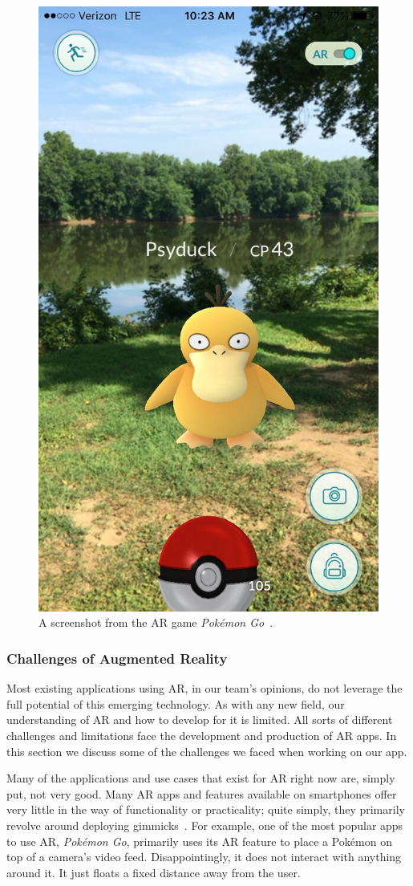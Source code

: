 \documentclass[a4paper, 10pt, american, titlepage]{article}
\begin{document}
\begin{figure}[h]
	\centering
	\includegraphics[width=.5\textwidth]{pokemon-go.jpg}
	\caption[A screenshot from the AR game \textit{Pokémon Go}]{A screenshot
		from the AR game \textit{Pokémon Go}~\autocite{vastateparks2016}.}
	\label{fig:pokemonGo}
\end{figure}

\subsubsection{Challenges of Augmented Reality}
\label{sec:challengesOfAugmentedReality}

Most existing applications using AR, in our team's opinions, do not leverage the
full potential of this emerging technology. As with any new field, our
understanding of AR and how to develop for it is limited. All sorts of different
challenges and limitations face the development and production of AR apps. In
this section we discuss some of the challenges we faced when working on our app.

Many of the applications and use cases that exist for AR right now are, simply
put, not very good. Many AR apps and features available on smartphones offer
very little in the way of functionality or practicality; quite simply, they
primarily revolve around deploying gimmicks~\autocite{theappsolutions2018}. For
example, one of the most popular apps to use AR, \textit{Pokémon Go}, primarily
uses its AR feature to place a Pokémon on top of a camera's video feed.
Disappointingly, it does not interact with anything around it. It just floats a
fixed distance away from the user.
\end{document}
